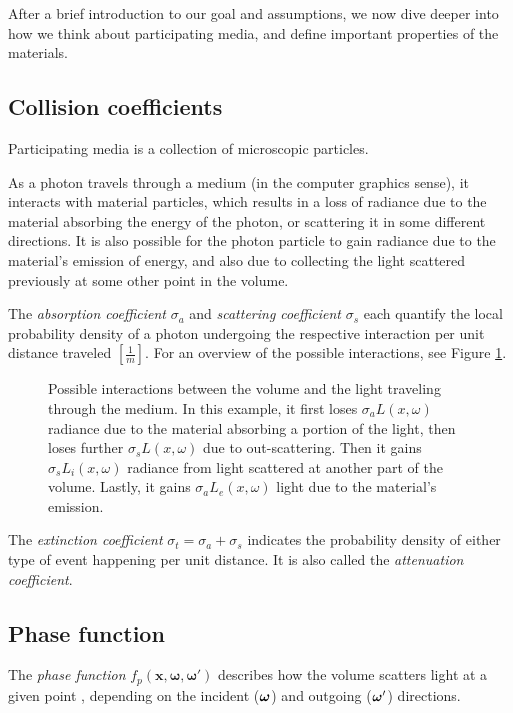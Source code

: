 After a brief introduction to our goal and assumptions, we now dive deeper into how we think about participating media, and define important properties of the materials.

\subsection{Collision coefficients}
Participating media is a collection of microscopic particles.

As a photon travels through a medium (in the computer graphics sense), it interacts with material particles, which results in a loss of radiance due to the material absorbing the energy of the photon, or scattering it in some different directions. It is also possible for the photon particle to gain radiance due to the material's emission of energy, and also due to collecting the light scattered previously at some other point in the volume.

The \textit{absorption coefficient} $\sigma_a$ and 
\textit{scattering coefficient} $\sigma_s$ each quantify the local 
probability density of a photon undergoing the respective interaction per unit distance traveled $[\frac{1}{m}]$. For an overview of the possible interactions, see Figure \ref{fig:interactions}.

\begin{figure}[ht]
    \centering
    
    \caption{
        Possible interactions between the volume and the light traveling through the medium. In this example, it first loses $\sigma_a L(x, \omega)$ radiance due to the material absorbing a portion of the light, then loses further $\sigma_s L(x, \omega)$ due to out-scattering. Then it gains $\sigma_s L_i(x, \omega)$ radiance from light scattered at another part of the volume. Lastly, it gains $\sigma_a L_e(x, \omega)$ light due to the material's emission.
    }
    \label{fig:interactions}
\end{figure}

The \textit{extinction coefficient} $\sigma_t = \sigma_a + \sigma_s$ indicates
the probability density of either type of event happening per unit distance.
It is also called the \textit{attenuation coefficient}.

\subsection{Phase function}

The \textit{phase function} 
$f_p(\textbf{x}, \boldsymbol{\omega},\boldsymbol{\omega}')$
describes how the volume scatters light at a given point \bx, depending on the incident ($\boldsymbol{\omega}$) and outgoing ($\boldsymbol{\omega}'$) directions.

